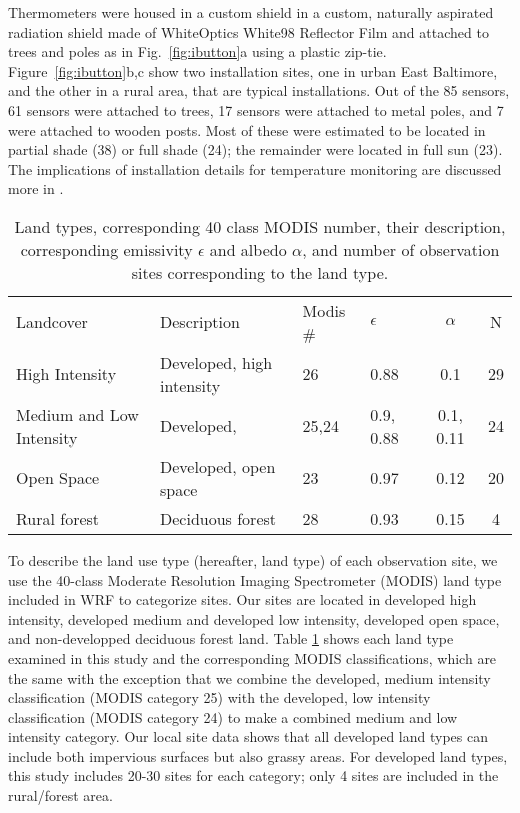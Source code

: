 \documentclass[draft,linenumbers]{agujournal}
\begin{document}
Thermometers were housed in a custom shield in a custom, naturally aspirated radiation shield made of WhiteOptics White98 Reflector Film and attached to trees and poles as in Fig.~\ref{fig:ibutton}a using a plastic zip-tie. 
Figure~\ref{fig:ibutton}b,c show two installation sites, one in urban East Baltimore, and the other in a rural area, that are typical installations. 
Out of the 85 sensors, 61 sensors were attached to trees, 17 sensors were attached to metal poles, and 7 were attached to wooden posts. Most of these were estimated to be located in partial shade (38) or full shade (24); the remainder were located in full sun (23). The implications of installation details for temperature monitoring are discussed more in \cite{scott2017intraurban}.

\begin{table}
\centering
\begin{tabular}{l l l l c c}
Landcover & Description &  Modis \# & $\epsilon$ & $\alpha$ & N  \\
High Intensity & Developed, high intensity & 26& 0.88 &0.1 & 29 \\
Medium and Low Intensity & Developed, & 25,24& 0.9, 0.88 & 0.1, 0.11& 24\\
Open Space& Developed, open space &23 & 0.97 & 0.12 & 20\\
Rural forest&Deciduous forest & 28& 0.93& 0.15& 4\\
\end{tabular}
\caption{Land types, corresponding 40 class MODIS number, their description, corresponding emissivity $\epsilon$ and albedo $\alpha$, and number of observation sites corresponding to the land type.}
\label{tab:lcc}
\end{table}

 To describe the land use type (hereafter, land type) of each observation site, we use the 40-class Moderate Resolution Imaging Spectrometer (MODIS) land type included in WRF to categorize sites. Our sites are located in developed high intensity, developed medium and developed low intensity, developed open space, and non-developped deciduous forest land.
 Table \ref{tab:lcc} shows each land type examined in this study and the corresponding MODIS classifications, which are the same with the exception that we combine the developed, medium intensity classification (MODIS category 25) with the developed, low intensity classification (MODIS category 24) to make a combined medium and low intensity category. Our local site data shows that all developed land types can include both impervious surfaces but also grassy areas. 
For developed land types, this study includes 20-30 sites for each category; only 4 sites are included in the rural/forest area. 
\end{document}
